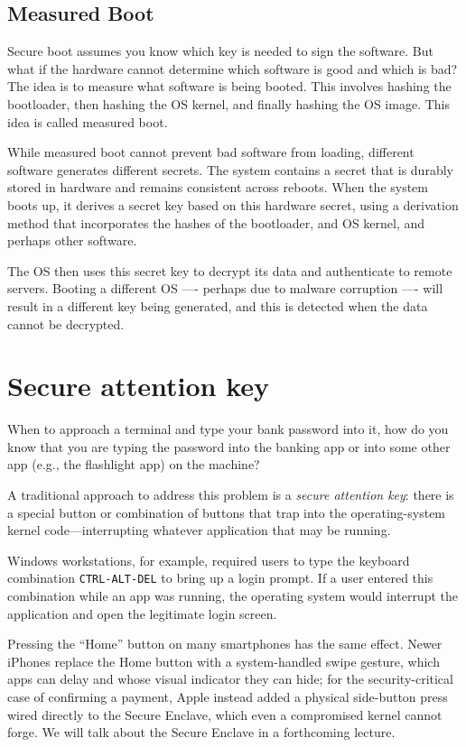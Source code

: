 \subsection{Measured Boot}

Secure boot assumes you know which key is needed to sign the software. But what if the hardware cannot determine which software is good and which is bad? The idea is to measure what software is being booted. This involves hashing the bootloader, then hashing the OS kernel, and finally hashing the OS image. This idea is called measured boot.

While measured boot cannot prevent bad software from loading, different software generates different secrets. The system contains a secret that is durably stored in hardware and remains consistent across reboots. When the system boots up, it derives a secret key based on this hardware secret, using a derivation method that incorporates the hashes of the bootloader, and OS kernel, and perhaps other software.

The OS then uses this secret key to decrypt its data and authenticate to remote servers. Booting a different OS —- perhaps due to malware corruption —- will result in a different key being generated, and this is detected when the data cannot be decrypted.

\section{Secure attention key}

When to approach a terminal and type your bank password into it,
how do you know that you are typing the password into 
the banking app or into some other app (e.g., the flashlight app)
on the machine?

A traditional approach to address this problem is a
\emph{secure attention key}: there is a special button
or combination of buttons that trap into the operating-system
kernel code---interrupting whatever application that may
be running.

Windows workstations, for example, required users to 
type the keyboard combination \texttt{CTRL-ALT-DEL} to
bring up a login prompt.
If a user entered this combination while an app was
running, the operating system would interrupt the
application and open the legitimate login screen.

Pressing the ``Home'' button on many smartphones 
has the same effect.
Newer iPhones replace the Home button with a system-handled swipe gesture, which apps can delay and whose visual indicator they can hide; for the security-critical case of confirming a payment, Apple instead added a physical side-button press wired directly to the Secure Enclave, which even a compromised kernel cannot forge. We will talk about the Secure Enclave in a forthcoming lecture.
